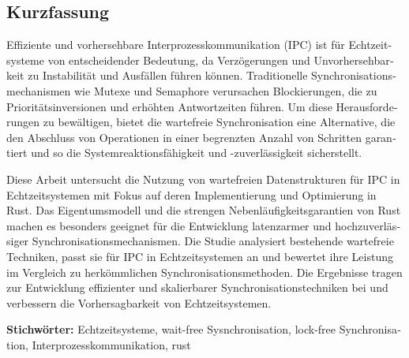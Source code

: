 \cleardoublepage

\begin{otherlanguage}{ngerman}
\chapter*{Kurzfassung}


Effiziente und vorhersehbare Interprozesskommunikation (IPC) ist für Echtzeitsysteme von entscheidender Bedeutung, da Verzögerungen und Unvorhersehbarkeit zu Instabilität und Ausfällen führen können. Traditionelle Synchronisationsmechanismen wie Mutexe und Semaphore verursachen Blockierungen, die zu Prioritätsinversionen und erhöhten Antwortzeiten führen. Um diese Herausforderungen zu bewältigen, bietet die wartefreie Synchronisation eine Alternative, die den Abschluss von Operationen in einer begrenzten Anzahl von Schritten garantiert und so die Systemreaktionsfähigkeit und -zuverlässigkeit sicherstellt.

Diese Arbeit untersucht die Nutzung von wartefreien Datenstrukturen für IPC in Echtzeitsystemen mit Fokus auf deren Implementierung und Optimierung in Rust. Das Eigentumsmodell und die strengen Nebenläufigkeitsgarantien von Rust machen es besonders geeignet für die Entwicklung latenzarmer und hochzuverlässiger Synchronisationsmechanismen. Die Studie analysiert bestehende wartefreie Techniken, passt sie für IPC in Echtzeitsystemen an und bewertet ihre Leistung im Vergleich zu herkömmlichen Synchronisationsmethoden. Die Ergebnisse tragen zur Entwicklung effizienter und skalierbarer Synchronisationstechniken bei und verbessern die Vorhersagbarkeit von Echtzeitsystemen.

\vfill
\noindent\textbf{Stichwörter:} Echtzeitsysteme, wait-free Sysnchronisation, lock-free Synchronisation, Interprozesskommunikation, rust
\vfill
\end{otherlanguage}
